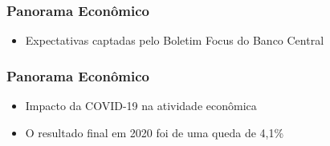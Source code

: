 \documentclass[12pt,aspectratio=169]{beamer}
\begin{document}
\begin{frame}
    \frametitle{Panorama Econômico}
    \begin{itemize}
        \item Expectativas captadas pelo Boletim Focus do Banco Central
    \end{itemize}

	\begin{figure}%
		\centering
	\end{figure}



\end{frame}
\begin{frame}
	\frametitle{Panorama Econômico}
	\begin{itemize}
		\item Impacto da COVID-19 na atividade econômica
		\item O resultado final em 2020 foi de uma queda de 4,1\%

	\end{itemize}
	
	\begin{figure}%
		\centering
		\qquad
	\end{figure}
\end{frame}
\end{document}
